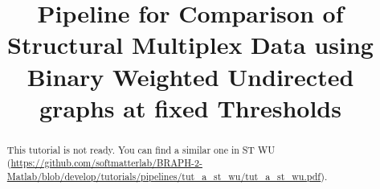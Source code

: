 \documentclass[justified]{tufte-handout}
\title{Pipeline for Comparison of Structural Multiplex Data using Binary Weighted Undirected graphs at fixed Thresholds}
\begin{document}
\maketitle

\begin{abstract}
\noindent
This tutorial is not ready. You can find a similar one in ST WU (\url{https://github.com/softmatterlab/BRAPH-2-Matlab/blob/develop/tutorials/pipelines/tut_a_st_wu/tut_a_st_wu.pdf}).
\end{abstract}
\end{document}
